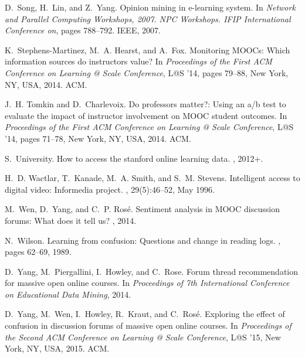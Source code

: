 \documentclass{edm_template}
\begin{document}
\begin{thebibliography}{10}
D.~Song, H.~Lin, and Z.~Yang.
\newblock Opinion mining in e-learning system.
\newblock In {\em Network and Parallel Computing Workshops, 2007. NPC
  Workshops. IFIP International Conference on}, pages 788--792. IEEE, 2007.

K.~Stephens-Martinez, M.~A. Hearst, and A.~Fox.
\newblock Monitoring {MOOC}s: Which information sources do instructors value?
\newblock In {\em Proceedings of the First ACM Conference on Learning @ Scale
  Conference}, L@S '14, pages 79--88, New York, NY, USA, 2014. ACM.

J.~H. Tomkin and D.~Charlevoix.
\newblock Do professors matter?: Using an a/b test to evaluate the impact of
  instructor involvement on {MOOC} student outcomes.
\newblock In {\em Proceedings of the First ACM Conference on Learning @ Scale
  Conference}, L@S '14, pages 71--78, New York, NY, USA, 2014. ACM.

S.~University.
\newblock How to access the stanford online learning data.
, 2012+.

H.~D. Wactlar, T.~Kanade, M.~A. Smith, and S.~M. Stevens.
\newblock Intelligent access to digital video: Informedia project.
, 29(5):46--52, May 1996.

M.~Wen, D.~Yang, and C.~P. Ros{\'e}.
\newblock Sentiment analysis in {MOOC} discussion forums: What does it tell us?
, 2014.

N.~Wilson.
\newblock Learning from confusion: Questions and change in reading logs.
, pages 62--69, 1989.

D.~Yang, M.~Piergallini, I.~Howley, and C.~Rose.
\newblock Forum thread recommendation for massive open online courses.
\newblock In {\em Proceedings of 7th International Conference on Educational
  Data Mining}, 2014.

D.~Yang, M.~Wen, I.~Howley, R.~Kraut, and C.~Ros{\'e}.
\newblock Exploring the effect of confusion in discussion forums of massive
  open online courses.
\newblock In {\em Proceedings of the Second ACM Conference on Learning @ Scale
  Conference}, L@S '15, New York, NY, USA, 2015. ACM.
  
\end{thebibliography}
\balancecolumns
\end{document}
